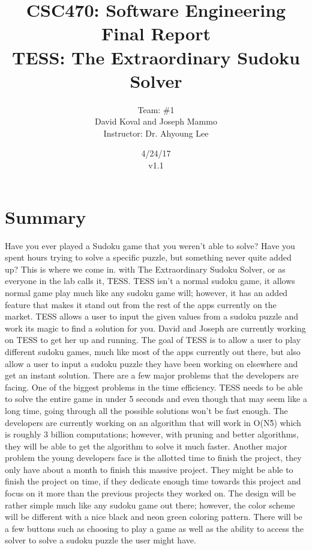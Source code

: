 \documentclass{article}
\title{CSC470: Software Engineering Final Report\\ TESS: The Extraordinary Sudoku Solver}
\author{Team: \#1 \\David Koval and Joseph Mammo\\Instructor: Dr. Ahyoung Lee}
\date{ 4/24/17 \\ v1.1 }
\begin{document}
 
\maketitle

\clearpage

\tableofcontents

\clearpage

\section{Summary} 
\todo{!!!} Have you ever played a Sudoku game that you weren’t able to solve? Have you spent hours trying to solve a specific puzzle, but something never quite added up? This is where we come in. with The Extraordinary Sudoku Solver, or as everyone in the lab calls it, TESS. TESS isn’t a normal sudoku game, it allows normal game play much like any sudoku game will; however, it has an added feature that makes it stand out from the rest of the apps currently on the market. TESS allows a user to input the given values from a sudoku puzzle and work its magic to find a solution for you. David and Joseph are currently working on TESS to get her up and running. 
	The goal of TESS is to allow a user to play different sudoku games, much like most of the apps currently out there, but also allow a user to input a sudoku puzzle they have been working on elsewhere and get an instant solution. There are a few major problems that the developers are facing. One of the biggest problems in the time efficiency. TESS needs to be able to solve the entire game in under 5 seconds and even though that may seem like a long time, going through all the possible solutions won’t be fast enough. The developers are currently working on an algorithm that will work in O(N\^5) which is roughly 3 billion computations; however, with pruning and better algorithms, they will be able to get the algorithm to solve it much faster. Another major problem the young developers face is the allotted time to finish the project, they only have about a month to finish this massive project. They might be able to finish the project on time, if they dedicate enough time towards this project and focus on it more than the previous projects they worked on. 
	The design will be rather simple much like any sudoku game out there; however, the color scheme will be different with a nice black and neon green coloring pattern. There will be a few buttons such as choosing to play a game as well as the ability to access the solver to solve a sudoku puzzle the user might have.
\end{document}
